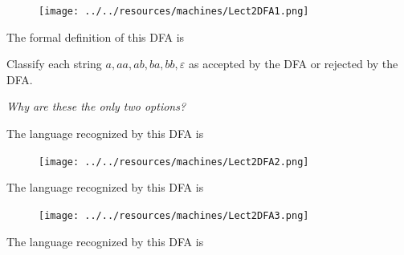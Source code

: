 \documentclass[12pt, oneside]{article}
\begin{document}
\begin{figure}[h]
   \centering
   \texttt{[image: ../../resources/machines/Lect2DFA1.png]} 
\end{figure}
   
The formal definition of this DFA is
   
\vspace{100pt}
   

Classify each string $a, aa, ab, ba, bb, \varepsilon$ as accepted by the DFA or rejected by the DFA.  

{\it Why are these the only two options?}

\vspace{200pt}


The language recognized by this DFA is
  
\vspace{100pt}
   

\begin{figure}[h]
  \centering
  \texttt{[image: ../../resources/machines/Lect2DFA2.png]} 
\end{figure}
   

The language recognized by this DFA is
  
\vspace{100pt}

\begin{figure}[h]
    \centering
    \texttt{[image: ../../resources/machines/Lect2DFA3.png]} 
\end{figure}

The language recognized by this DFA is
  
\vspace{100pt}
 \vfill
\end{document}
